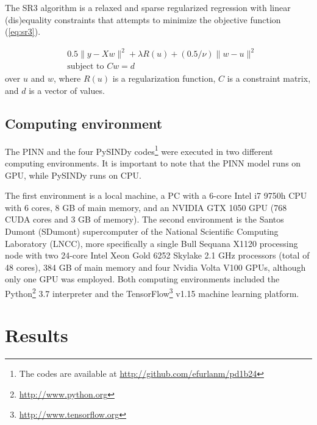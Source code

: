 \documentclass[conference]{IEEEtran}
\begin{document}
The SR3 algorithm \cite{Champion2019} is a relaxed and sparse regularized regression with linear (dis)equality constraints that attempts to minimize the objective function (\autoref{eq:sr3}).

\begin{minipage}[htb]{.95\columnwidth}\bigskip\begin{equation}\begin{aligned}
&0.5  \|  y  -  X  w \|^2 + \lambda  R(u) + (0.5 / \nu)  \|  w  -  u  \|^2\\
&\text{subject to } Cw = d
\label{eq:sr3}\end{aligned}\end{equation}
over $u$ and $w$, where $R(u)$ is a regularization function, $C$ is a constraint matrix, and $d$ is a vector of values.
\bigskip\end{minipage}%

\subsection{Computing environment}
\label{sec:cenv}

The PINN and the four PySINDy codes\footnote{The codes are available at \url{http://github.com/efurlanm/pd1b24}} were executed in two different computing environments. It is important to note that the PINN model runs on GPU, while PySINDy runs on CPU.

The first environment is a local machine, a PC with a 6-core Intel i7 9750h CPU with 6 cores, 8 GB of main memory, and an NVIDIA GTX 1050 GPU (768 CUDA cores and 3 GB of memory). The second environment is the Santos Dumont (SDumont) supercomputer of the National Scientific Computing Laboratory (LNCC), more specifically a single Bull Sequana X1120 processing node with two 24-core Intel Xeon Gold 6252 Skylake 2.1 GHz processors (total of 48 cores), 384 GB of main memory and four Nvidia Volta V100 GPUs, although only one GPU was employed. Both computing environments included the Python\footnote{\url{http://www.python.org}} 3.7 interpreter and the TensorFlow\footnote{\url{http://www.tensorflow.org}} v1.15 machine learning platform.

\section{Results}
\label{sec:resu}
\end{document}
